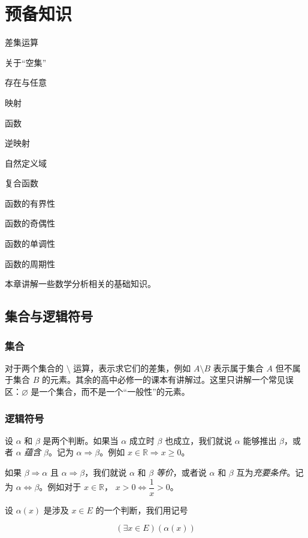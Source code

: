 \documentclass[lang=cn,10pt]{template}
\begin{document}
\chapter{预备知识}
\begin{introduction}
  \item 差集运算
  \item 关于“空集”
  \item 存在与任意
  \item 映射
  \item 函数
  \item 逆映射
  \item 自然定义域
  \item 复合函数
  \item 函数的有界性
  \item 函数的奇偶性
  \item 函数的单调性
  \item 函数的周期性
\end{introduction}
本章讲解一些数学分析相关的基础知识。

\section{集合与逻辑符号}

\subsection{集合}
对于两个集合的 $\setminus$ 运算，表示求它们的差集，例如 $A \setminus B$ 表示属于集合 $A$ 但不属于集合 $B$ 的元素。其余的高中必修一的课本有讲解过。这里只讲解一个常见误区：$\varnothing$ 是一个集合，而不是一个“一般性”的元素。

\subsection{逻辑符号}
设 $\alpha$ 和 $\beta$ 是两个判断。如果当 $\alpha$ 成立时 $\beta$ 也成立，我们就说 $\alpha$ 能够推出 $\beta$，或者 $\alpha$ \emph{蕴含} $\beta$。记为 $\alpha \Rightarrow \beta$。例如 $x \in \mathbb{R} \Rightarrow x \geq 0$。

如果 $\beta\Rightarrow\alpha$ 且 $\alpha\Rightarrow\beta$，我们就说 $\alpha$ 和 $\beta$ \emph{等价}，或者说 $\alpha$ 和 $\beta$ 互为\emph{充要条件}。记为 $\alpha \Leftrightarrow \beta$。例如对于 $x \in \mathbb{R}$， $x > 0 \Leftrightarrow \dfrac 1x > 0$。

设 $\alpha(x)$ 是涉及 $x \in E$ 的一个判断，我们用记号

\begin{equation*}
  (\exists x \in E)(\alpha(x))
\end{equation*}
\end{document}
